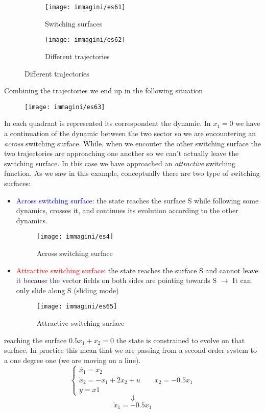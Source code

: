 \begin{figure}[H]
	\centering
	\begin{subfigure}[b]{0.3\textwidth}
		\centering
		\texttt{[image: immagini/es61]}
		\caption{Switching surfaces}
		\label{fig:es61}
	\end{subfigure}
	\hfill
	\begin{subfigure}[b]{0.3\textwidth}
		\centering
		\texttt{[image: immagini/es62]}
		\caption{Different trajectories}
		\label{fig:es62}
	\end{subfigure}
	\hfill
	\label{fig:asdf}
\end{figure}
Combining the trajectories we end up in the following situation
\begin{figure}[H]
	\centering
	\texttt{[image: immagini/es63]}
	\caption{}
	\label{fig:es63}
\end{figure}
In each quadrant is represented its correspondent the dynamic. In $x_1=0$ we have a continuation of the dynamic between the two sector so we are encountering an \emph{across} switching surface. While, when we encouter the other switching surface the two trajectories are approaching one another so we can't actually leave the switching surface. In this case we have approached an \emph{attractive} switching function.
As we saw in this example, conceptually there are two type of switching surfaces:
\begin{itemize}
	\item \textcolor{blue}{Across switching surface}: the state reaches the surface S while following some dynamics, crosses it, and continues its evolution according to the other dynamics.
	\begin{figure}[H]
		\centering
		\texttt{[image: immagini/es4]}
		\caption{Across switching surface}
		\label{fig:es4}
	\end{figure}
	\item \textcolor{red}{Attractive switching surface}: the state reaches the surface S and cannot leave it because the vector fields on both sides are pointing towards S
	$\to$ It can only slide along S (sliding mode)
	\begin{figure}[H]
		\centering
		\texttt{[image: immagini/es65]}
		\caption{Attractive switching surface}
		\label{fig:es65}
	\end{figure}
\end{itemize}
 reaching the surface $0.5 x_1+x_2=0$ the state is constrained to evolve on that surface. In practice this mean that we are passing from a second order system to a one degree one (we are moving on a line).
 \[
 \begin{cases}
 	\dot{x_1}=x_2\\
 	\dot{x}_2=-x_1+2x_2+u\qquad x_2=-0.5x_1\\
 	y=x1
 \end{cases}
 \]
 \[\Downarrow\]\[\dot{x}_1=-0.5x_1\] 
 
